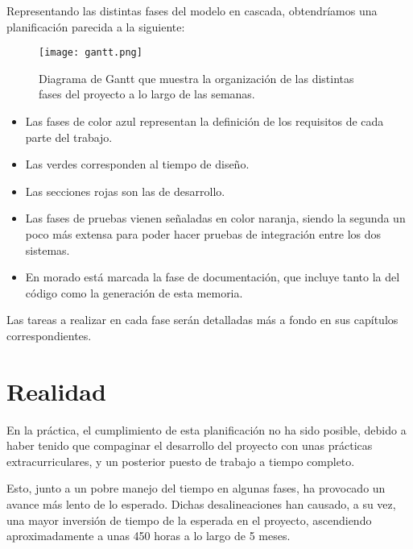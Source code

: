 Representando las distintas fases del modelo en cascada, obtendríamos una planificación parecida a la siguiente:

\begin{figure}[ht]
	\centering
	\texttt{[image: gantt.png]}
	\caption{Diagrama de Gantt que muestra la organización de las distintas fases del proyecto a lo largo de las semanas.}
\end{figure}

\begin{itemize}
    \item Las fases de color azul representan la definición de los requisitos de cada parte del trabajo.
    \item Las verdes corresponden al tiempo de diseño.
    \item Las secciones rojas son las de desarrollo.
    \item Las fases de pruebas vienen señaladas en color naranja, siendo la segunda un poco más extensa para poder hacer pruebas de integración entre los dos sistemas.
    \item En morado está marcada la fase de documentación, que incluye tanto la del código como la generación de esta memoria.
\end{itemize}

Las tareas a realizar en cada fase serán detalladas más a fondo en sus capítulos correspondientes.

\section{Realidad}

En la práctica, el cumplimiento de esta planificación no ha sido posible, debido a haber tenido que compaginar el desarrollo del proyecto con unas prácticas extracurriculares, y un posterior puesto de trabajo a tiempo completo.

Esto, junto a un pobre manejo del tiempo en algunas fases, ha provocado un avance más lento de lo esperado. Dichas desalineaciones han causado, a su vez, una mayor inversión de tiempo de la esperada en el proyecto, ascendiendo aproximadamente a unas 450 horas a lo largo de 5 meses.
